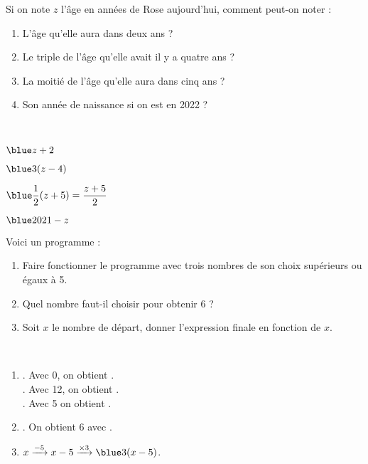 \begin{colonne*exercice}
\bigskip


\begin{exercice} %
   Si on note $z$ l'âge en années de Rose aujourd'hui, comment peut-on noter :
   \begin{enumerate}
      \item L'âge qu'elle aura dans deux ans ?
      \item Le triple de l'âge qu'elle avait il y a quatre ans ?
      \item La moitié de l'âge qu'elle aura dans cinq ans ?
      \item Son année de naissance si on est en 2022 ?
   \end{enumerate}
\end{exercice}

\begin{corrige}
   \ \\ [-5mm]
   \begin{colenumerate}{2}
      \item $\blue z+2$
      \item $\blue 3(z-4)$
      \item $\blue \dfrac12(z+5) =\dfrac{z+5}{2}$ \smallskip
      \item $\blue 2021-z$
   \end{colenumerate}
\end{corrige}

\bigskip


\begin{exercice} %
   Voici un programme :
   \begin{center}
   \end{center}
   \begin{enumerate}
      \item Faire fonctionner le programme avec trois nombres de son choix supérieurs ou égaux à 5.
      \item Quel nombre faut-il choisir pour obtenir 6 ?
      \item Soit $x$ le nombre de départ, donner l'expression finale en fonction de $x$.
   \end{enumerate}
\end{exercice}

\begin{corrige}
   \ \\ [-5mm]
   \begin{enumerate}
      \item {}. Avec 0, on obtient {}. \\ [1mm]
         . Avec 12, on obtient {}. \\ [1mm]
         . Avec 5 on obtient {}. \smallskip
      \item {}. On obtient 6 avec {}. \smallskip
      \item $x\xrightarrow{-5}x-5\xrightarrow{\times3}\blue3(x-5)$.
   \end{enumerate}
\end{corrige}


\end{colonne*exercice}
